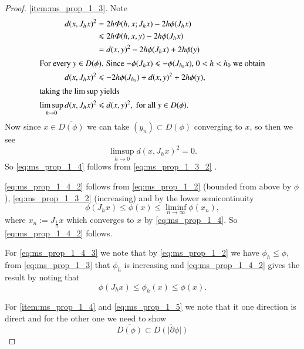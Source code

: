 \documentclass[a4paper,11pt, leqno]{scrreprt} %
\renewcommand{\leq}{\leqslant}
\renewcommand{\leq}{\leqslant}
\theoremstyle{change}
\theoremstyle{nonumberplain}
\newtheorem{proof}{Proof}
\begin{document}
\begin{proof}
  \ref{item:ms_prop_1_3}. Note
  \begin{equation}
    \label{eq:ms_prop_1_14}
    \begin{split}
      d(x, J_h x)^2 &= 2h \Phi(h, x; J_h x) - 2h \phi(J_h x)\\
      &\leq 2h \Phi(h, x, y) - 2h \phi(J_h x)\\
      &= d(x, y)^2 - 2h \phi(J_h x) + 2h \phi(y)\\
      \shortintertext{For every $y \in D(\phi)$. Since $-\phi(J_h x)
        \leq -\phi(J_{h_0} x)$, $0 < h < h_0$ we obtain}
      d(x, J_h x)^2 &\leq -2h \phi(J_{h_0}) + d(x, y)^2 + 2h \phi(y),\\
      \shortintertext{taking the $\limsup$ yields}
      \limsup_{h \to 0} d(x, J_h x)^2 &\leq d(x, y)^2, \text{ for all
        $y \in D(\phi)$.}
    \end{split}
  \end{equation}
  Now since $x \in \overline{D(\phi)}$ we can take $(y_n) \subset
  D(\phi)$ converging to $x$, so then we see
  \begin{equation}
    \label{eq:ms_prop_1_15}
    \limsup_{h \to 0} d(x, J_h x)^2 = 0.
  \end{equation}
  So \eqref{eq:ms_prop_1_4} follows from \eqref{eq:ms_prop_1_3_2}
  .

  \eqref{eq:ms_prop_1_4_2} follows from \eqref{eq:ms_prop_1_2}
  (bounded from above by $\phi$), \eqref{eq:ms_prop_1_3_2}
  (increasing) and by the lower semicontinuity
  \begin{equation}
    \label{eq:ms_prop_1_16}
    \phi(J_h x) \leq \phi(x) \leq \liminf_{n \to \infty} \phi(x_n),
  \end{equation}
  where $x_n := J_{\frac1n} x$ which converges to $x$ by
  \eqref{eq:ms_prop_1_4}. So \eqref{eq:ms_prop_1_4_2} follows.

  For \eqref{eq:ms_prop_1_4_3} we note that by \eqref{eq:ms_prop_1_2}
  we have $\phi_h \leq \phi$, from \eqref{eq:ms_prop_1_3} that
  $\phi_h$ is increasing and \eqref{eq:ms_prop_1_4_2} gives the result
  by noting that
  \begin{equation}
    \label{eq:ms_prop_1_17}
    \phi(J_h x) \leq \phi_h(x) \leq \phi(x).
  \end{equation}

  For \ref{item:ms_prop_1_4} and \eqref{eq:ms_prop_1_5} we note that
  it one direction is direct and for the other one we need to show
  \begin{equation}
    \label{eq:ms_prop_1_18}
    \overline{D(\phi)} \subset \overline{D(|\partial \phi|)}
  \end{equation}
\end{proof}
\end{document}
